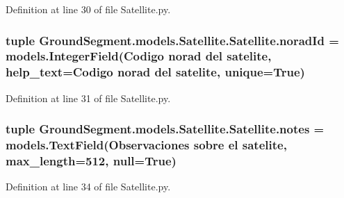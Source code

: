 Definition at line 30 of file Satellite.\+py.

\hypertarget{class_ground_segment_1_1models_1_1_satellite_1_1_satellite_a7962e5b81ff68f4fdedb33ce54bd4368}{}
\subsubsection[{norad\+Id}]{\setlength{\rightskip}{0pt plus 5cm}tuple Ground\+Segment.\+models.\+Satellite.\+Satellite.\+norad\+Id = models.\+Integer\+Field(\textquotesingle{}Codigo norad del satelite\textquotesingle{}, help\+\_\+text=\textquotesingle{}Codigo norad del satelite\textquotesingle{}, unique=True)\hspace{0.3cm}{\ttfamily [static]}}\label{class_ground_segment_1_1models_1_1_satellite_1_1_satellite_a7962e5b81ff68f4fdedb33ce54bd4368}


Definition at line 31 of file Satellite.\+py.

\hypertarget{class_ground_segment_1_1models_1_1_satellite_1_1_satellite_a6ae6b5fad6dd1a31200d8dd8e0ba07a0}{}
\subsubsection[{notes}]{\setlength{\rightskip}{0pt plus 5cm}tuple Ground\+Segment.\+models.\+Satellite.\+Satellite.\+notes = models.\+Text\+Field(\textquotesingle{}Observaciones sobre el satelite\textquotesingle{}, max\+\_\+length=512, null=True)\hspace{0.3cm}{\ttfamily [static]}}\label{class_ground_segment_1_1models_1_1_satellite_1_1_satellite_a6ae6b5fad6dd1a31200d8dd8e0ba07a0}


Definition at line 34 of file Satellite.\+py.

\hypertarget{class_ground_segment_1_1models_1_1_satellite_1_1_satellite_a4cdd4dae77da6f58058ca51ac71bd31d}{}
